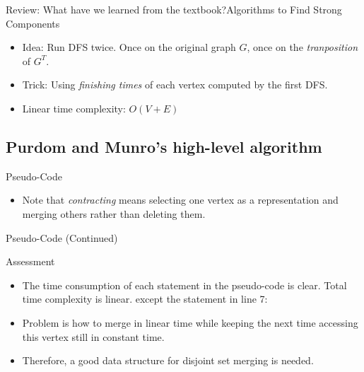 \documentclass{beamer}
\begin{document}
\begin{frame}{Review: What have we learned from the textbook?}{Algorithms to Find Strong Components}
	\begin{itemize}
		\item
		Idea: Run DFS twice. Once on the original graph $G$, once on the \emph{tranposition} of $G^T$.
		\item
		Trick: Using \emph{finishing times} of each vertex computed by the first DFS.
		\item
		Linear time complexity: $O(V+E)$
	\end{itemize}
\end{frame}


\subsection{Purdom and Munro's high-level algorithm}

\begin{frame}{Pseudo-Code}%
	\mycodea
	\begin{itemize}
		\item
		Note that \emph{contracting} means selecting one vertex as a representation and \alert{merging} others rather than deleting them.
	\end{itemize}
\end{frame}

\begin{frame}{Pseudo-Code (Continued)}%
	\mycodeb
\end{frame}

\begin{frame}{Assessment}
	\begin{itemize}
		\item
		The time consumption of each statement in the pseudo-code is clear. Total time complexity is linear.
		except the statement in line 7:
	\end{itemize}
	\mycodec
	\begin{itemize}
		\item
		Problem is how to merge in linear time while keeping the next time accessing this vertex still in constant time.
		\item
		Therefore, a good data structure for disjoint set merging is needed.
	\end{itemize}
\end{frame}
\end{document}
